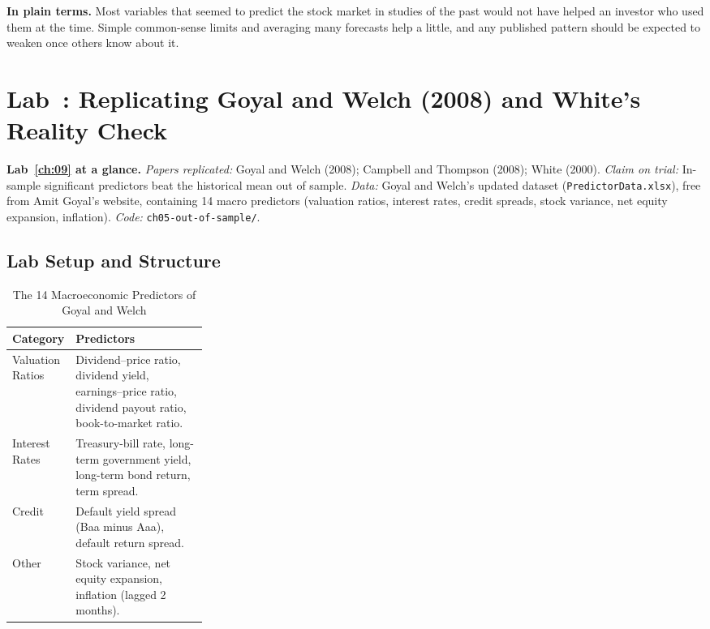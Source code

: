 \noindent\textbf{In plain terms.} Most variables that seemed to predict the stock market in studies of the past would not have helped an investor who used them at the time. Simple common-sense limits and averaging many forecasts help a little, and any published pattern should be expected to weaken once others know about it.

\section{Lab~\thechapter: Replicating Goyal and Welch (2008) and White's Reality Check}
\label{sec:09-lab}

\begin{callout}
\textbf{Lab~\ref{ch:09} at a glance.} \emph{Papers replicated:} Goyal and Welch (2008); Campbell and Thompson (2008); White (2000). \emph{Claim on trial:} In-sample significant predictors beat the historical mean out of sample. \emph{Data:} Goyal and Welch's updated dataset (\texttt{PredictorData.xlsx}), free from Amit Goyal's website, containing 14 macro predictors (valuation ratios, interest rates, credit spreads, stock variance, net equity expansion, inflation). \emph{Code:} \texttt{ch05-out-of-sample/}.
\end{callout}

\subsection*{Lab Setup and Structure}
\begin{table}[htbp]
\centering
\small
\caption{The 14 Macroeconomic Predictors of Goyal and Welch}
\label{tab:09-goyal-predictors}
\begin{tabularx}{0.95\linewidth}{@{}>{\raggedright\arraybackslash}p{0.28\linewidth}>{\raggedright\arraybackslash}X@{}}
\toprule
Category & Predictors \\
\midrule
Valuation Ratios & Dividend--price ratio, dividend yield, earnings--price ratio, dividend payout ratio, book-to-market ratio. \\
Interest Rates & Treasury-bill rate, long-term government yield, long-term bond return, term spread. \\
Credit & Default yield spread (Baa minus Aaa), default return spread. \\
Other & Stock variance, net equity expansion, inflation (lagged 2 months). \\
\bottomrule
\end{tabularx}
\end{table}

